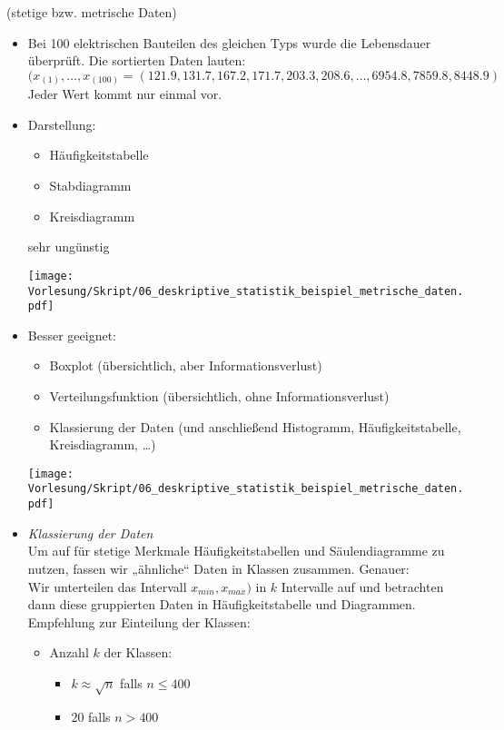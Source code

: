 \documentclass{scrreprt}
\begin{document}
 (stetige bzw. metrische Daten)
\begin{itemize}
\item Bei 100 elektrischen Bauteilen des gleichen Typs wurde die Lebensdauer überprüft. Die sortierten Daten lauten:
$$(x_{(1)}, \ldots, x_{(100)} = (121.9,131.7,167.2,171.7,203.3,208.6,\ldots,6954.8,7859.8,8448.9)$$
Jeder Wert kommt nur einmal vor.
\item Darstellung:
\begin{itemize}
\item Häufigkeitstabelle
\item Stabdiagramm
\item Kreisdiagramm
\end{itemize}
sehr ungünstig
\begin{center}
\texttt{[image: Vorlesung/Skript/06\_deskriptive\_statistik\_beispiel\_metrische\_daten.pdf]}
\end{center}
\item Besser geeignet:
\begin{itemize}
\item Boxplot (übersichtlich, aber Informationsverlust)
\item Verteilungsfunktion (übersichtlich, ohne Informationsverlust)
\item Klassierung der Daten (und anschließend Histogramm, Häufigkeitstabelle, Kreisdiagramm, …)
\end{itemize}
\begin{center}
\texttt{[image: Vorlesung/Skript/06\_deskriptive\_statistik\_beispiel\_metrische\_daten.pdf]}
\end{center}
\item \emph{Klassierung der Daten}\\
Um auf für stetige Merkmale Häufigkeitstabellen und Säulendiagramme zu nutzen, fassen wir „ähnliche“ Daten in Klassen zusammen. Genauer:\\
Wir unterteilen das Intervall $x_{min},x_{max})$ in $k$ Intervalle auf und betrachten dann diese gruppierten Daten in Häufigkeitstabelle und Diagrammen.\\
Empfehlung zur Einteilung der Klassen:
\begin{itemize}
\item Anzahl $k$ der Klassen:
\begin{itemize}
\item $k \approx \sqrt{n}$ falls $n\leq 400$
\item $20$ falls $n > 400$

\end{itemize}
\end{itemize}
\end{itemize}
\end{document}
